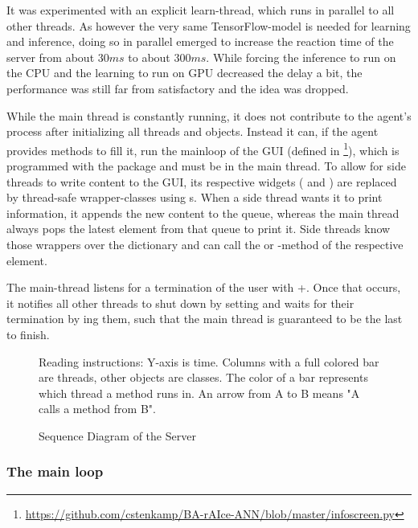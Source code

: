 It was experimented with an explicit learn-thread, which runs in parallel to all other threads. As however the very same TensorFlow-model is needed for learning and inference, doing so in parallel emerged to increase the reaction time of the server from about $30ms$ to about $300ms$. While forcing the inference to run on the CPU and the learning to run on GPU decreased the delay a bit, the performance was still far from satisfactory and the idea was dropped.

While the main thread is constantly running, it does not contribute to the agent's process after initializing all threads and objects. Instead it can, if the agent provides methods to fill it, run the mainloop of the GUI (defined in \footnote{\url{https://github.com/cstenkamp/BA-rAIce-ANN/blob/master/infoscreen.py}}), which is programmed with the package  and must be in the main thread. To allow for side threads to write content to the GUI, its respective widgets ( and ) are replaced by thread-safe wrapper-classes using s. When a side thread wants it to print information, it appends the new content to the queue, whereas the main thread always pops the latest element from that queue to print it. Side threads know those wrappers over the dictionary  and can call the  or -method of the respective element.

The main-thread listens for a termination of the user with +. Once that occurs, it notifies all other threads to shut down by setting  and waits for their termination by ing them, such that the main thread is guaranteed to be the last to finish.


\begin{figure}[h!]
	\centering
	\resizebox{1.1\textwidth}{!}{
		
	}
	\caption{Sequence Diagram of the Server}
	\label{fig:sequenceserver}
	\medskip
	\scriptsize
	Reading instructions: Y-axis is time. Columns with a full colored bar are threads, other objects are classes. The color of a bar represents which thread a method runs in. An arrow from A to B means "A calls a method from B".
\end{figure}

\subsubsection{The main loop}

